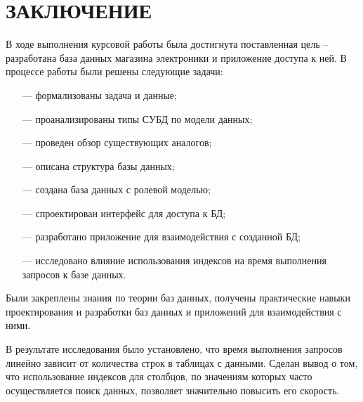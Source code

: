 \section*{ЗАКЛЮЧЕНИЕ}

В ходе выполнения курсовой работы была достигнута поставленная цель -- разработана база данных магазина электроники и приложение доступа к ней. В процессе работы были решены следующие задачи:

\begin{itemize}[leftmargin=0.7cm +  - ]
	\item[---] формализованы задача и данные;
	\item[---] проанализированы типы СУБД по модели данных;
	\item[---] проведен обзор существующих аналогов;
	\item[---] описана структура базы данных;
	\item[---] создана база данных с ролевой моделью;
	\item[---] спроектирован интерфейс для доступа к БД;
	\item[---] разработано приложение для взаимодействия с созданной БД;
	\item[---] исследовано влияние использования индексов на время выполнения запросов к базе данных.
\end{itemize}

Были закреплены знания по теории баз данных, получены практические навыки проектирования и разработки баз данных и приложений для взаимодействия с ними.

В результате исследования было установлено, что время выполнения запросов линейно зависит от количества строк в таблицах с данными. Сделан вывод о том, что использование индексов для столбцов, по значениям которых часто осуществляется поиск данных, позволяет значительно повысить его скорость.

\pagebreak